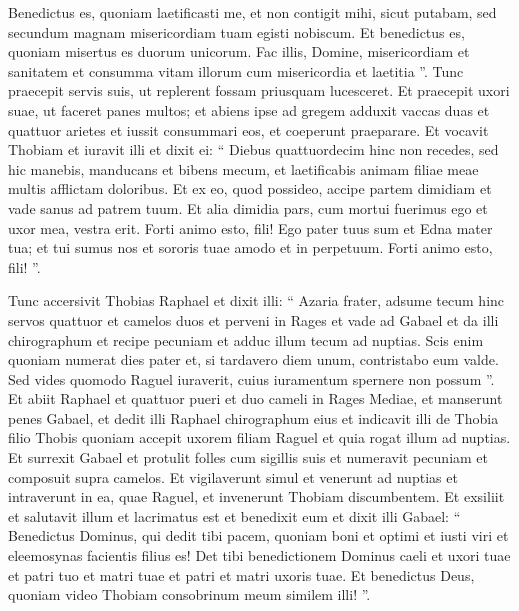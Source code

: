 \begin{biblechapter}
\begin{biblechapter}
\begin{biblechapter}
\begin{biblechapter}
\begin{biblechapter}
\begin{biblechapter}
\begin{biblechapter}
\begin{biblechapter}
\verse Benedictus es, quoniam laetificasti me, et non contigit mihi, sicut putabam, sed secundum magnam misericordiam tuam egisti nobiscum. 
\verse Et benedictus es, quoniam misertus es duorum unicorum. Fac illis, Domine, misericordiam et sanitatem et consumma vitam illorum cum misericordia et laetitia ”. 
\verse Tunc praecepit servis suis, ut replerent fossam priusquam lucesceret.
 \verse Et praecepit uxori suae, ut faceret panes multos; et abiens ipse ad gregem adduxit vaccas duas et quattuor arietes et iussit consummari eos, et coeperunt praeparare. 
\verse Et vocavit Thobiam et iuravit illi et dixit ei: “ Diebus quattuordecim hinc non recedes, sed hic manebis, manducans et bibens mecum, et laetificabis animam filiae meae multis afflictam doloribus. 
\verse Et ex eo, quod possideo, accipe partem dimidiam et vade sanus ad patrem tuum. Et alia dimidia pars, cum mortui fuerimus ego et uxor mea, vestra erit. Forti animo esto, fili! Ego pater tuus sum et Edna mater tua; et tui sumus nos et sororis tuae amodo et in perpetuum. Forti animo esto, fili! ”.
 
\begin{biblechapter}
\verse Tunc accersivit Thobias Raphael et dixit illi: 
\verse “ Azaria frater, adsume tecum hinc servos quattuor et camelos duos et perveni in Rages et vade ad Gabael et da illi chirographum et recipe pecuniam et adduc illum tecum ad nuptias. 
\verse Scis enim quoniam numerat dies pater et, si tardavero diem unum, contristabo eum valde. 
\verse Sed vides quomodo Raguel iuraverit, cuius iuramentum spernere non possum ”. 
\verse Et abiit Raphael et quattuor pueri et duo cameli in Rages Mediae, et manserunt penes Gabael, et dedit illi Raphael chirographum eius et indicavit illi de Thobia filio Thobis quoniam accepit uxorem filiam Raguel et quia rogat illum ad nuptias. Et surrexit Gabael et protulit folles cum sigillis suis et numeravit pecuniam et composuit supra camelos. 
\verse Et vigilaverunt simul et venerunt ad nuptias et intraverunt in ea, quae Raguel, et invenerunt Thobiam discumbentem. Et exsiliit et salutavit illum et lacrimatus est et benedixit eum et dixit illi Gabael: “ Benedictus Dominus, qui dedit tibi pacem, quoniam boni et optimi et iusti viri et eleemosynas facientis filius es! Det tibi benedictionem Dominus caeli et uxori tuae et patri tuo et matri tuae et patri et matri uxoris tuae. Et benedictus Deus, quoniam video Thobiam consobrinum meum similem illi! ”.
 

\end{biblechapter}
\end{biblechapter}
\end{biblechapter}
\end{biblechapter}
\end{biblechapter}
\end{biblechapter}
\end{biblechapter}
\end{biblechapter}
\end{biblechapter}
